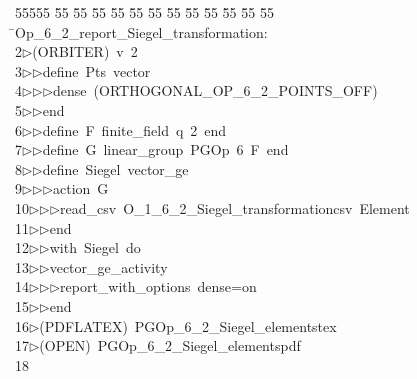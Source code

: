 %
%
\begin{tabbing}
55555 \= 55 \= 55 \= 55 \= 55 \= 55 \= 55 \= 55 \= 55 \= 55 \= 55 \= 55 \= 55 \= \>Op\_6\_2\_report\_Siegel\_transformation:\\[0pt]
2\>$\triangleright$\>(ORBITER)\ v\ 2\ \\[0pt]
3\>$\triangleright$\>$\triangleright$\>define\ Pts\ vector\ \\[0pt]
4\>$\triangleright$\>$\triangleright$\>$\triangleright$\>dense\ (ORTHOGONAL\_OP\_6\_2\_POINTS\_OFF)\ \\[0pt]
5\>$\triangleright$\>$\triangleright$\>end\ \\[0pt]
6\>$\triangleright$\>$\triangleright$\>define\ F\ finite\_field\ q\ 2\ end\ \\[0pt]
7\>$\triangleright$\>$\triangleright$\>define\ G\ linear\_group\ PGOp\ 6\ F\ end\ \\[0pt]
8\>$\triangleright$\>$\triangleright$\>define\ Siegel\ vector\_ge\ \\[0pt]
9\>$\triangleright$\>$\triangleright$\>$\triangleright$\>action\ G\ \\[0pt]
10\>$\triangleright$\>$\triangleright$\>$\triangleright$\>read\_csv\ O\_1\_6\_2\_Siegel\_transformationcsv\ Element\ \\[0pt]
11\>$\triangleright$\>$\triangleright$\>end\ \\[0pt]
12\>$\triangleright$\>$\triangleright$\>with\ Siegel\ do\ \\[0pt]
13\>$\triangleright$\>$\triangleright$\>vector\_ge\_activity\ \\[0pt]
14\>$\triangleright$\>$\triangleright$\>$\triangleright$\>report\_with\_options\ dense=on\ \\[0pt]
15\>$\triangleright$\>$\triangleright$\>end\ \\[0pt]
16\>$\triangleright$\>(PDFLATEX)\ PGOp\_6\_2\_Siegel\_elementstex\\[0pt]
17\>$\triangleright$\>(OPEN)\ PGOp\_6\_2\_Siegel\_elementspdf\\[0pt]
18\>\end{tabbing}
